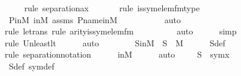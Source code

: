 \begin{isabellebody}
\ \ \ \ \isamarkupfalse%
{\isacharparenleft}{\kern0pt}rule\ separation{\isacharunderscore}{\kern0pt}ax{\isacharparenright}{\kern0pt}\isanewline
\ \ \ \ \ \ \isamarkupfalse%
{\isacharparenleft}{\kern0pt}rule\ is{\isacharunderscore}{\kern0pt}sym{\isacharunderscore}{\kern0pt}elem{\isacharunderscore}{\kern0pt}fm{\isacharunderscore}{\kern0pt}type{\isacharparenright}{\kern0pt}\isanewline
\ \ \ \ \isamarkupfalse%
\ P{\isacharunderscore}{\kern0pt}in{\isacharunderscore}{\kern0pt}M\ {\isasymG}{\isacharunderscore}{\kern0pt}in{\isacharunderscore}{\kern0pt}M\ assms\ P{\isacharunderscore}{\kern0pt}name{\isacharunderscore}{\kern0pt}in{\isacharunderscore}{\kern0pt}M\isanewline
\ \ \ \ \ \ \ \ \ \isamarkupfalse%
\ auto{\isacharbrackleft}{\kern0pt}{}{\isacharbrackright}{\kern0pt}\isanewline
\ \ \ \ \isamarkupfalse%
{\isacharparenleft}{\kern0pt}rule\ le{\isacharunderscore}{\kern0pt}trans{\isacharcomma}{\kern0pt}\ rule\ arity{\isacharunderscore}{\kern0pt}is{\isacharunderscore}{\kern0pt}sym{\isacharunderscore}{\kern0pt}elem{\isacharunderscore}{\kern0pt}fm{\isacharparenright}{\kern0pt}\isanewline
\ \ \ \ \ \ \ \ \isamarkupfalse%
\ auto{\isacharbrackleft}{\kern0pt}{}{\isacharbrackright}{\kern0pt}\isanewline
\ \ \ \ \isamarkupfalse%
\ simp\ \isanewline
\ \ \ \ \isamarkupfalse%
{\isacharparenleft}{\kern0pt}rule\ Un{\isacharunderscore}{\kern0pt}least{\isacharunderscore}{\kern0pt}lt{\isacharparenright}{\kern0pt}{\isacharplus}{\kern0pt}\isanewline
\ \ \ \ \isamarkupfalse%
\ auto\isanewline
\ \ \isanewline
\ \ \isamarkupfalse%
\ \isamarkupfalse%
\ SinM\ {\isacharcolon}{\kern0pt}\ {\isachardoublequoteopen}S\ {\isasymin}\ M{\isachardoublequoteclose}\isanewline
\ \ \ \ \isamarkupfalse%
\ S{\isacharunderscore}{\kern0pt}def\ \isanewline
\ \ \ \ \isamarkupfalse%
{\isacharparenleft}{\kern0pt}rule\ separation{\isacharunderscore}{\kern0pt}notation{\isacharparenright}{\kern0pt}\isanewline
\ \ \ \ \isamarkupfalse%
\ {\isasymG}{\isacharunderscore}{\kern0pt}in{\isacharunderscore}{\kern0pt}M\isanewline
\ \ \ \ \isamarkupfalse%
\ auto\ \isanewline
\isanewline
\ \ \isamarkupfalse%
\ {\isachardoublequoteopen}S\ {\isacharequal}{\kern0pt}\ sym{\isacharparenleft}{\kern0pt}x{\isacharparenright}{\kern0pt}{\isachardoublequoteclose}\ \isanewline
\ \ \ \ \isamarkupfalse%
\ S{\isacharunderscore}{\kern0pt}def\ sym{\isacharunderscore}{\kern0pt}def\ \isanewline

\end{isabellebody}
